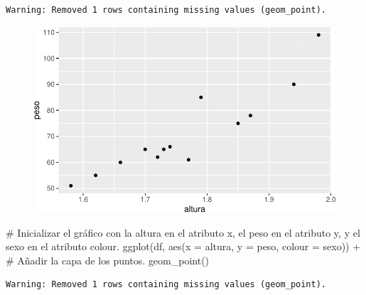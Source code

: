 \documentclass[
  a4paper,
]{scrreport}
\newenvironment{Shaded}{\begin{snugshade}}{\end{snugshade}}
\newcommand{\AttributeTok}[1]{\textcolor[rgb]{0.40,0.45,0.13}{#1}}
\newcommand{\CommentTok}[1]{\textcolor[rgb]{0.37,0.37,0.37}{#1}}
\newcommand{\FunctionTok}[1]{\textcolor[rgb]{0.28,0.35,0.67}{#1}}
\newcommand{\NormalTok}[1]{\textcolor[rgb]{0.00,0.23,0.31}{#1}}
\newcommand{\SpecialCharTok}[1]{\textcolor[rgb]{0.37,0.37,0.37}{#1}}
\theoremstyle{definition}
\theoremstyle{definition}
\theoremstyle{remark}
\begin{document}
\begin{verbatim}
Warning: Removed 1 rows containing missing values (geom_point).
\end{verbatim}

\begin{figure}[H]

{\centering \includegraphics{./07-graficos_files/figure-pdf/unnamed-chunk-4-1.pdf}

}

\end{figure}

\begin{Shaded}
\begin{Highlighting}[]
\CommentTok{\# Inicializar el gráfico con la altura en el atributo x, el peso en el atributo y, y el sexo en el atributo colour.}
\FunctionTok{ggplot}\NormalTok{(df, }\FunctionTok{aes}\NormalTok{(}\AttributeTok{x =}\NormalTok{ altura, }\AttributeTok{y =}\NormalTok{ peso, }\AttributeTok{colour =}\NormalTok{ sexo)) }\SpecialCharTok{+}
\CommentTok{\# Añadir la capa de los puntos.}
    \FunctionTok{geom\_point}\NormalTok{()}
\end{Highlighting}
\end{Shaded}

\begin{verbatim}
Warning: Removed 1 rows containing missing values (geom_point).
\end{verbatim}
\end{document}
